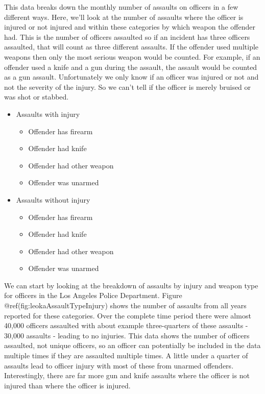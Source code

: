 \documentclass[
  12pt,
  openany]{book}
\providecommand{\tightlist}{%
  \setlength{\itemsep}{0pt}\setlength{\parskip}{0pt}}
\begin{document}
This data breaks down the monthly number of assaults on officers in a few different ways. Here, we'll look at the number of assaults where the officer is injured or not injured and within these categories by which weapon the offender had. This is the number of officers assaulted so if an incident has three officers assaulted, that will count as three different assaults. If the offender used multiple weapons then only the most serious weapon would be counted. For example, if an offender used a knife and a gun during the assault, the assault would be counted as a gun assault. Unfortunately we only know if an officer was injured or not and not the severity of the injury. So we can't tell if the officer is merely bruised or was shot or stabbed.

\begin{itemize}
\tightlist
\item
  Assaults with injury

  \begin{itemize}
  \tightlist
  \item
    Offender has firearm
  \item
    Offender had knife
  \item
    Offender had other weapon
  \item
    Offender was unarmed
  \end{itemize}
\item
  Assaults without injury

  \begin{itemize}
  \tightlist
  \item
    Offender has firearm
  \item
    Offender had knife
  \item
    Offender had other weapon
  \item
    Offender was unarmed
  \end{itemize}
\end{itemize}

We can start by looking at the breakdown of assaults by injury and weapon type for officers in the Los Angeles Police Department. Figure @ref(fig:leokaAssaultTypeInjury) shows the number of assaults from all years reported for these categories. Over the complete time period there were almost 40,000 officers assaulted with about example three-quarters of these assaults - 30,000 assaults - leading to no injuries. This data shows the number of officers assaulted, not unique officers, so an officer can potentially be included in the data multiple times if they are assaulted multiple times. A little under a quarter of assaults lead to officer injury with most of these from unarmed offenders. Interestingly, there are far more gun and knife assaults where the officer is not injured than where the officer is injured.
\end{document}
